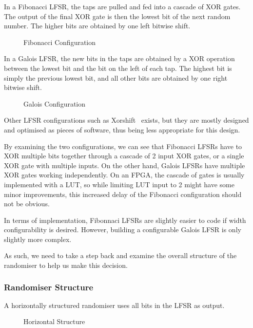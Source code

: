 In a Fibonacci LFSR, the taps are pulled and fed into a cascade of XOR gates.
The output of the final XOR gate is then the lowest bit of the next random number.
The higher bits are obtained by one left bitwise shift.

\begin{figure}[ht]
  \centering
  
  \caption{Fibonacci Configuration}
  \label{FibLFSR}
\end{figure}

In a Galois LFSR, the new bits in the taps are obtained by a XOR operation between the lowest bit and the bit on the left of each tap.
The highest bit is simply the previous lowest bit, and all other bits are obtained by one right bitwise shift.

\begin{figure}[ht]
  \centering
  
  \caption{Galois Configuration}
  \label{GalLFSR}
\end{figure}

Other LFSR configurations such as Xorshift~\cite{Marsaglia1} exists, but they are mostly designed and optimised as pieces of software, thus being less appropriate for this design.

By examining the two configurations, we can see that Fibonacci LFSRs have to XOR multiple bits together through a cascade of 2 input XOR gates, or a single XOR gate with multiple inputs.
On the other hand, Galois LFSRs have multiple XOR gates working independently.
On an FPGA, the cascade of gates is usually implemented with a LUT, so while limiting LUT input to 2 might have some minor improvements, this increased delay of the Fibonacci configuration should not be obvious.

In terms of implementation, Fibonnaci LFSRs are slightly easier to code if width configurability is desired.
However, building a configurable Galois LFSR is only slightly more complex.

As such, we need to take a step back and examine the overall structure of the randomiser to help us make this decision.

\subsubsection{Randomiser Structure}

A horizontally structured randomiser uses all bits in the LFSR as output.

\begin{figure}[ht]
  \centering
  
  \caption{Horizontal Structure}
  \label{HoriLFSR}
\end{figure}

